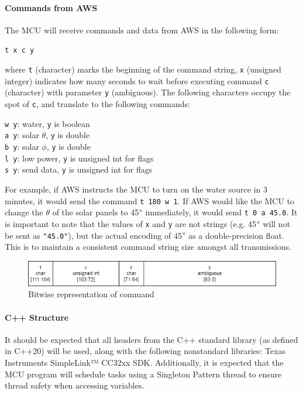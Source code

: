 \paragraph{Commands from AWS}
The MCU will receive commands and data from AWS in the following form:
\begin{center}
    \texttt{t x c y}
\end{center}
where \texttt{t} (character) marks the beginning of the command string,
\texttt{x} (unsigned integer) indicates how many seconds to wait before
executing command \texttt{c} (character) with parameter \texttt{y}
(ambiguous). The following characters occupy the spot of \texttt{c}, and
translate to the following commands:
\begin{center}
    \texttt{w y}: water, \texttt{y} is boolean \\
    \texttt{a y}: solar $\theta$, \texttt{y} is double \\
    \texttt{b y}: solar $\phi$, \texttt{y} is double \\
    \texttt{l y}: low power, \texttt{y} is unsigned int for flags \\
    \texttt{s y}: send data, \texttt{y} is unsigned int for flags
\end{center}
For example, if AWS instructs the MCU to turn on the water source in 3
minutes, it would send the command \texttt{t 180 w 1}. If AWS would like
the MCU to change the $\theta$ of the solar panels to 45$\degree$
immediately, it would send \texttt{t 0 a 45.0}. It is important to note
that the values of \texttt{x} and \texttt{y} are not strings (e.g.
45$\degree$ will not be sent as \texttt{"45.0"}), but the actual encoding
of 45$\degree$ as a double-precision float. This is to maintain a
consistent command string size amongst all transmissions.
\begin{figure}[H]
    \caption{Bitwise representation of command}
    \label{command_bitwise}
    \centering
    \includegraphics[width=\textwidth]{images/command_encoding.png}
\end{figure}

\paragraph{C++ Structure}
It should be expected that all headers from the C++ standard library (as
defined in C++20) will be used, along with the following nonstandard
libraries: Texas Instruments SimpleLink™ CC32xx SDK. Additionally, it is
expected that the MCU program will schedule tasks using a Singleton Pattern
thread to ensure thread safety when accessing variables.

